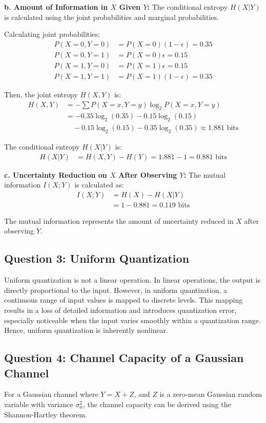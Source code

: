\documentclass{article}
\begin{document}
\textbf{b. Amount of Information in \( X \) Given \( Y \):}
The conditional entropy \( H(X|Y) \) is calculated using the joint probabilities and marginal probabilities.

Calculating joint probabilities:
\begin{align*}
    P(X=0, Y=0) &= P(X=0)(1 - \epsilon) = 0.35 \\
    P(X=0, Y=1) &= P(X=0)\epsilon = 0.15 \\
    P(X=1, Y=0) &= P(X=1)\epsilon = 0.15 \\
    P(X=1, Y=1) &= P(X=1)(1 - \epsilon) = 0.35
\end{align*}

Then, the joint entropy \( H(X, Y) \) is:
\begin{align*}
    H(X, Y) &= -\sum P(X=x, Y=y) \log_2 P(X=x, Y=y) \\
    &= -0.35 \log_2(0.35) - 0.15 \log_2(0.15) \\
    &\quad - 0.15 \log_2(0.15) - 0.35 \log_2(0.35) \approx 1.881 \text{ bits}
\end{align*}

The conditional entropy \( H(X|Y) \) is:
\begin{align*}
    H(X|Y) &= H(X, Y) - H(Y) = 1.881 - 1 = 0.881 \text{ bits}
\end{align*}

\textbf{c. Uncertainty Reduction on \( X \) After Observing \( Y \):}
The mutual information \( I(X; Y) \) is calculated as:
\begin{align*}
    I(X; Y) &= H(X) - H(X|Y) \\
    &= 1 - 0.881 = 0.119 \text{ bits}
\end{align*}

The mutual information represents the amount of uncertainty reduced in \( X \) after observing \( Y \).
\subsection*{Question 3: Uniform Quantization}
Uniform quantization is not a linear operation. In linear operations, the output is directly proportional to the input. However, in uniform quantization, a continuous range of input values is mapped to discrete levels. This mapping results in a loss of detailed information and introduces quantization error, especially noticeable when the input varies smoothly within a quantization range. Hence, uniform quantization is inherently nonlinear.

\subsection*{Question 4: Channel Capacity of a Gaussian Channel}
For a Gaussian channel where \( Y = X + Z \), and \( Z \) is a zero-mean Gaussian random variable with variance \( \sigma_n^2 \), the channel capacity can be derived using the Shannon-Hartley theorem.
\end{document}
